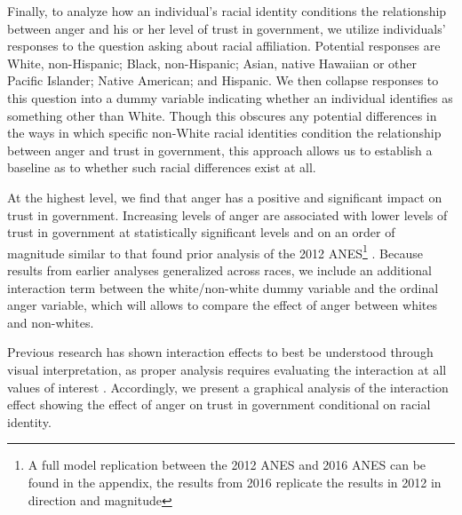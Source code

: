 \documentclass[12t, letterpaper]{article}
\begin{document}
Finally, to analyze how an individual's racial identity conditions the relationship between anger and his or her level of trust in government, we utilize individuals' responses to the question asking about racial affiliation. Potential responses are White, non-Hispanic; Black, non-Hispanic; Asian, native Hawaiian or other Pacific Islander; Native American; and Hispanic. We then collapse responses to this question into a dummy variable indicating whether an individual identifies as something other than White. Though this obscures any potential differences in the ways in which specific non-White racial identities condition the relationship between anger and trust in government, this approach allows us to establish a baseline as to whether such racial differences exist at all.

At the highest level, we find that anger has a positive and significant impact on trust in government. Increasing levels of anger are associated with lower levels of trust in government at statistically significant levels and on an order of magnitude similar to that found prior analysis of the 2012 ANES\footnote{A full model replication between the 2012 ANES and 2016 ANES can be found in the appendix, the results from 2016 replicate the results in 2012 in direction and magnitude} \citep{webster2017}. Because results from earlier analyses generalized across races, we include an additional interaction term between the white/non-white dummy variable and the ordinal anger variable, which will allows to compare the effect of anger between whites and non-whites.

Previous research has shown interaction effects to best be understood through visual interpretation, as proper analysis requires evaluating the interaction at all values of interest \citep{brambor2006}. Accordingly, we present a graphical analysis of the interaction effect showing the effect of anger on trust in government conditional on racial identity.
\end{document}
